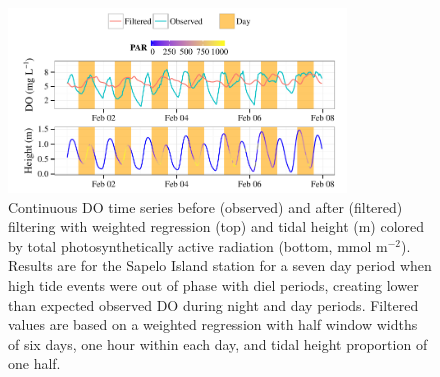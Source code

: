 \documentclass[letterpaper,12pt,oneside]{article}\usepackage[]{graphicx}\usepackage[]{color}
\newenvironment{knitrout}{}{} %
\begin{document}
\centering\vspace*{\fill}
\begin{knitrout}
\color{fgcolor}\begin{figure}[!ht]


{\centering \includegraphics[width=0.8\textwidth]{figure/phase_out} 

}

\caption[Continuous \ac{DO} time series before (observed) and after (filtered) filtering with weighted regression (top) and tidal height (m) colored by total photosynthetically active radiation (bottom, mmol m$^{-2}$)]{Continuous \ac{DO} time series before (observed) and after (filtered) filtering with weighted regression (top) and tidal height (m) colored by total photosynthetically active radiation (bottom, mmol m$^{-2}$). Results are for the Sapelo Island station for a seven day period when high tide events were out of phase with diel periods, creating lower than expected observed \ac{DO} during night and day periods. Filtered values are based on a weighted regression with half window widths of six days, one hour within each day, and tidal height proportion of one half.\label{fig:phase_out}}
\end{figure}


\end{knitrout}
\vfill
\clearpage
\end{document}
